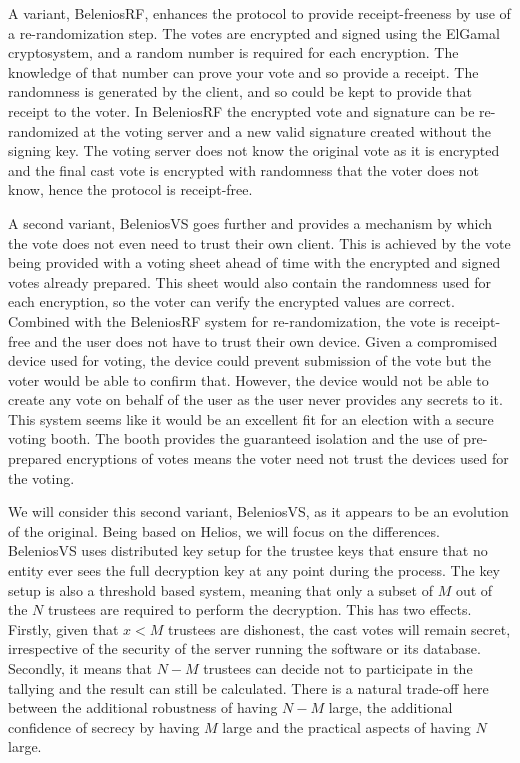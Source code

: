 A variant, BeleniosRF, enhances the protocol to provide receipt-freeness by use of a re-randomization step. The votes are encrypted and signed using the ElGamal cryptosystem, and a random number is required for each encryption. The knowledge of that number can prove your vote and so provide a receipt. The randomness is generated by the client, and so could be kept to provide that receipt to the voter. In BeleniosRF the encrypted vote and signature can be re-randomized at the voting server and a new valid signature created without the signing key. The voting server does not know the original vote as it is encrypted and the final cast vote is encrypted with randomness that the voter does not know, hence the protocol is receipt-free.

A second variant, BeleniosVS goes further and provides a mechanism by which the vote does not even need to trust their own client. This is achieved by the vote being provided with a voting sheet ahead of time with the encrypted and signed votes already prepared. This sheet would also contain the randomness used for each encryption, so the voter can verify the encrypted values are correct. Combined with the BeleniosRF system for re-randomization, the vote is receipt-free and the user does not have to trust their own device. Given a compromised device used for voting, the device could prevent submission of the vote but the voter would be able to confirm that. However, the device would not be able to create any vote on behalf of the user as the user never provides any secrets to it. This system seems like it would be an excellent fit for an election with a secure voting booth. The booth provides the guaranteed isolation and the use of pre-prepared encryptions of votes means the voter need not trust the devices used for the voting.

We will consider this second variant, BeleniosVS, as it appears to be an evolution of the original. Being based on Helios, we will focus on the differences. BeleniosVS uses distributed key setup for the trustee keys that ensure that no entity ever sees the full decryption key at any point during the process. The key setup is also a threshold based system, meaning that only a subset of $M$ out of the $N$ trustees are required to perform the decryption. This has two effects. Firstly, given that $x < M$ trustees are dishonest, the cast votes will remain secret, irrespective of the security of the server running the software or its database. Secondly, it means that $N-M$ trustees can decide not to participate in the tallying and the result can still be calculated. There is a natural trade-off here between the additional robustness of having $N-M$ large, the additional confidence of secrecy by having $M$ large and the practical aspects of having $N$ large.

